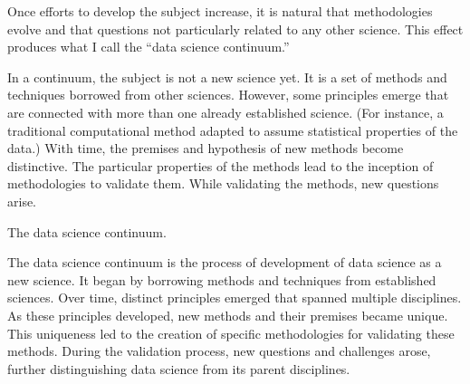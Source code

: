 Once efforts to develop the subject increase, it is natural that methodologies evolve and
that questions not particularly related to any other science.  This effect produces what I
call the ``data science continuum.''

In a continuum, the subject is not a new science yet.  It is a set of methods and
techniques borrowed from other sciences.  However, some principles emerge that are
connected with more than one already established science.  (For instance, a traditional
computational method adapted to assume statistical properties of the data.)  With time,
the premises and hypothesis of new methods become distinctive.  The particular properties
of the methods lead to the inception of methodologies to validate them. While validating
the methods, new questions arise.

\begin{figurebox}[label=fig:continuum]{The data science continuum.}
  \centering
  \tcblower
    The data science continuum is the process of development of data science as a new
    science.  It began by borrowing methods and techniques from established sciences. Over
    time, distinct principles emerged that spanned multiple disciplines. As these
    principles developed, new methods and their premises became unique. This uniqueness
    led to the creation of specific methodologies for validating these methods. During the
    validation process, new questions and challenges arose, further distinguishing data
    science from its parent disciplines.
\end{figurebox}

